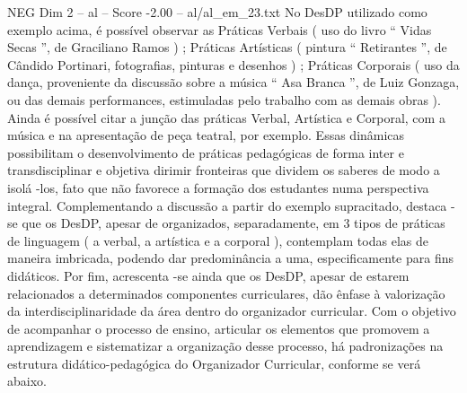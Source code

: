\begin{textsample}{NEG Dim 2 – al – Score -2.00 – al/al\_em\_23.txt}
No DesDP utilizado como exemplo acima, é possível observar as Práticas Verbais ( uso do livro “ Vidas Secas ”, de Graciliano Ramos ) ; Práticas Artísticas ( pintura “ Retirantes ”, de Cândido Portinari, fotografias, pinturas e desenhos ) ; Práticas Corporais ( uso da dança, proveniente da discussão sobre a música “ Asa Branca ”, de Luiz Gonzaga, ou das demais performances, estimuladas pelo trabalho com as demais obras ).
Ainda é possível citar a junção das práticas Verbal, Artística e Corporal, com a música e na apresentação de peça teatral, por exemplo.
Essas dinâmicas possibilitam o desenvolvimento de práticas pedagógicas de forma inter e transdisciplinar e objetiva dirimir fronteiras que dividem os saberes de modo a isolá -los, fato que não favorece a formação dos estudantes numa perspectiva integral.
Complementando a discussão a partir do exemplo supracitado, destaca -se que os DesDP, apesar de organizados, separadamente, em 3 tipos de práticas de linguagem ( a verbal, a artística e a corporal ), contemplam todas elas de maneira imbricada, podendo dar predominância a uma, especificamente para fins didáticos.
Por fim, acrescenta -se ainda que os DesDP, apesar de estarem relacionados a determinados componentes curriculares, dão ênfase à valorização da interdisciplinaridade da área dentro do organizador curricular.
Com o objetivo de acompanhar o processo de ensino, articular os elementos que promovem a aprendizagem e sistematizar a organização desse processo, há padronizações na estrutura didático-pedagógica do Organizador Curricular, conforme se verá abaixo.

\end{textsample}
